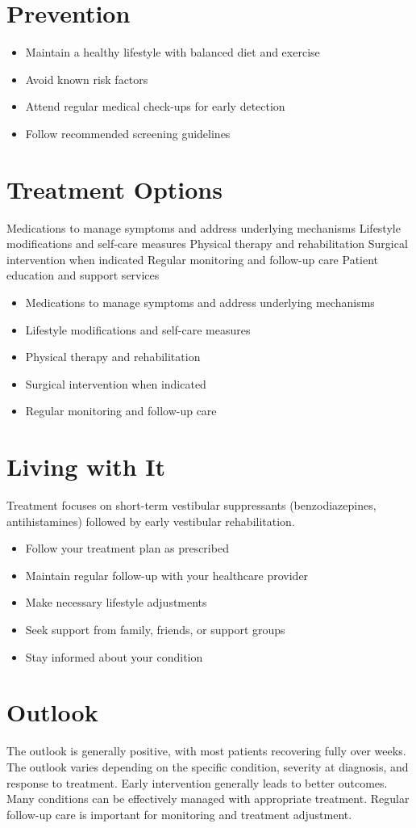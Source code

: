 \section{Prevention}
\begin{itemize}[noitemsep]
  \item Maintain a healthy lifestyle with balanced diet and exercise
  \item Avoid known risk factors
  \item Attend regular medical check-ups for early detection
  \item Follow recommended screening guidelines
\end{itemize}
\section{Treatment Options}
Medications to manage symptoms and address underlying mechanisms Lifestyle modifications and self-care measures Physical therapy and rehabilitation Surgical intervention when indicated Regular monitoring and follow-up care Patient education and support services

\begin{itemize}[noitemsep]
  \item Medications to manage symptoms and address underlying mechanisms
  \item Lifestyle modifications and self-care measures
  \item Physical therapy and rehabilitation
  \item Surgical intervention when indicated
  \item Regular monitoring and follow-up care
\end{itemize}
\section{Living with It}
Treatment focuses on short-term vestibular suppressants (benzodiazepines, antihistamines) followed by early vestibular rehabilitation.

\begin{itemize}[noitemsep]
  \item Follow your treatment plan as prescribed
  \item Maintain regular follow-up with your healthcare provider
  \item Make necessary lifestyle adjustments
  \item Seek support from family, friends, or support groups
  \item Stay informed about your condition
\end{itemize}
\section{Outlook}
The outlook is generally positive, with most patients recovering fully over weeks. The outlook varies depending on the specific condition, severity at diagnosis, and response to treatment. Early intervention generally leads to better outcomes. Many conditions can be effectively managed with appropriate treatment. Regular follow-up care is important for monitoring and treatment adjustment.
